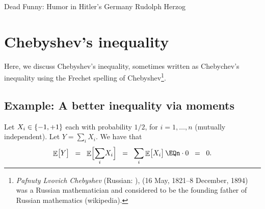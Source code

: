 \makeatletter
{}
\makeatother
\ifx\bookMode\undefined%
\fi



\ChapterPrefix{}
\ChapterGen{}

\medskip

%
{Dead Funny: Humor in Hitler's Germany}%
{Rudolph Herzog}




\section{Chebyshev's inequality}

Here, we discuss Chebyshev's inequality, sometimes written as Chebychev's
inequality using the Frechet spelling of Chebyshev\footnote{\emph{Pafnuty
      Lvovich Chebyshev} (Russian: ), (16 May, 1821--8 December, 1894) was a Russian
      mathematician and considered to be the founding father of Russian
      mathematics (wikipedia).}.


\subsection{Example: A better inequality via moments}


Let $X_i \in \left\{ {-1,+1} \right\}$ each with probability $1/2$, for
$i=1,\ldots, n$ (mutually independent). Let $Y= \sum_i X_i$. We have that
\begin{equation*}
    \Ex{Y\bigr.}%
    \EQ%
    \Ex{\Bigl. \smash{\sum_i} X_i}%
    \EQ%
    \smash{\sum_i} \Ex{X_i \bigr.}%
    \EQ%
    n \cdot 0%
    \EQ
    0.
\end{equation*}

